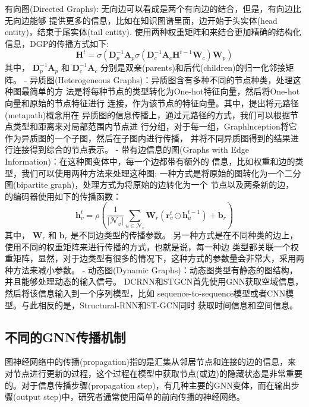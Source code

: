 \documentclass[a4paper,UTF8]{article}
\numberwithin{equation}{section}
\begin{document}
{		有向图(Directed Graphs): 无向边可以看成是两个有向边的结合，但是，有向边比无向边能够 提供更多的信息，比如在知识图谱里面，边开始于头实体(head entity)，结束于尾实体(tail entity).
		\citep{conf/Michael2019}使用两种权重矩阵和来结合更加精确的结构化信息，DGP的传播方式如下:
		$$
		\mathbf{H}^{t}=\sigma\left(\mathbf{D}_{p}^{-1} \mathbf{A}_{p} \sigma\left(\mathbf{D}_{c}^{-1} \mathbf{A}_{c} \mathbf{H}^{t-1} \mathbf{W}_{c}\right) \mathbf{W}_{p}\right)
		$$
		其中， $\mathbf{D}_{p}^{-1} \mathbf{A}_{p}$ 和 $\mathbf{D}_{c}^{-1} \mathbf{A}_{c}$ 分别是双亲(parents)和后代(children)的归一化邻接矩阵。
		- 异质图(Heterogeneous Graphs)：异质图含有多种不同的节点种类，处理这种图最简单的方 法是将每种节点的类型转化为One-hot特征向量，然后将One-hot向量和原始的节点特征进行
		连接，作为该节点的特征向量。其中，\citep{conf/YizhouZhang2018}提出将元路径(metapath)概念用在 异质图的信息传播上，通过元路径的方式，我们可以根据节点类型和距离来对局部范围内节点进 行分组，对于每一组，Graphlnception将它作为异质图的一个子图，然后在子图内进行传播， 并将不同异质图得到的结果进行连接得到综合的节点表示。
		- 带有边信息的图(Graphs with Edge Information)：在这种图变体中，每一个边都带有额外的 信息，比如权重和边的类型，我们可以使用两种方法来处理这种图:
		一种方式是将原始的图转化为一个二分图(bipartite graph)，处理方式为将原始的边转化为一个 节点以及两条新的边，\citep{conf/DanielBeck2018} 的编码器使用如下的传播函数：
		$$
		\mathbf{h}_{v}^{t}=\rho\left(\frac{1}{\left|\mathcal{N}_{v}\right|} \sum_{u \in \mathcal{N}_{v}} \mathbf{W}_{r}\left(\mathbf{r}_{v}^{t} \odot \mathbf{h}_{u}^{t-1}\right)+\mathbf{b}_{r}\right)
		$$
		其中， $\mathbf{W}_{r}$ 和 $\mathbf{b}_{r}$ 是不同边类型的传播参数。
		另一种方式是在不同种类的边上，使用不同的权重矩阵来进行传播的方式，也就是说，每一种边 类型都关联一个权重矩阵，显然，对于边类型有很多的情况下，这种方式的参数量会非常大，\citep{conf/Schlichtkrull2018}采用两种方法来减小参数。
		- 动态图(Dynamic Graphs)：动态图类型有静态的图结构，并且能够处理动态的输入信号。 DCRNN和STGCN首先使用GNN获取空域信息，然后将该信息输入到一个序列模型，比如 sequence-to-sequence模型或者CNN模型。与此相反的是，Structural-RNN和ST-GCN同时 获取时间信息和空间信息。
		
		
		\subsection{不同的GNN传播机制}
		图神经网络中的传播(propagation)指的是汇集从邻居节点和连接的边的信息，来对节点进行更新的过程，这个过程在模型中获取节点(或边)的隐藏状态是非常重要的。对于信息传播步骤(propagation step)，有几种主要的GNN变体，而在输出步骤(output step)中，研究者通常使用简单的前向传播的神经网络。
		
}
\end{document}
